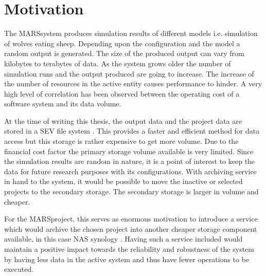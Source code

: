     
    \section{Motivation}
    
        The MARS\footnotemark system produces simulation results of 
        different models i.e. simulation of wolves eating sheep. Depending upon the 
        configuration and the model a random output is generated. The size of the produced
        output can vary from kilobytes to terabytes of data. As the system grows older the 
        number of simulation runs and the output produced are going to increase. The increase
        of the number of resources in the active entity causes performance to hinder. 
        A very high level of correlation has been observed between the operating cost of a software 
        system and its data volume. 
        
   
        \par

        At the time of writing this thesis, the output data and the project data are stored in a
        SEV file system \cite{SEV}. This provides a faster and efficient method for data
        access but this storage is rather expensive to get more volume. Due to the financial cost 
        factor the primary storage volume available is very limited. Since the simulation 
        results are random in nature, it is a point of interest to keep the data for future
        research purposes with its configurations. With archiving service in hand to the system, 
        it would be possible to move the inactive or selected projects to the secondary storage. 
        The secondary storage is larger in volume and cheaper. 
        
        \par

        For the MARS\footnotemark[\value{footnote}] project, this serves as enormous
        motivation to introduce a service which would archive the chosen project
        into another cheaper storage component available, in this case NAS synology 
        \cite{Synology}. Having such a service included would maintain a positive impact 
        towards the reliability and robustness of the system by having less data in the 
        active system and thus have fewer operations to be executed.
        



